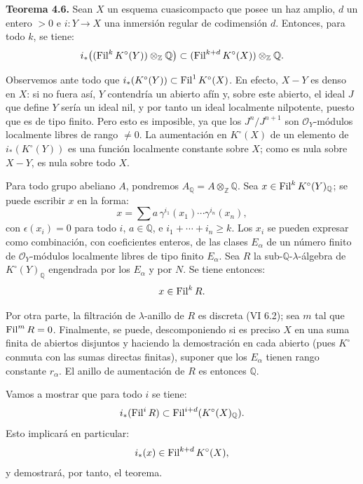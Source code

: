 \providecommand{\sisi}[2]{#2}

\textbf{Teorema 4.6.} Sean \(X\) un esquema cuasicompacto que posee un haz amplio, \(d\) un entero \(>0\) e \(i:Y\to X\) una inmersión regular de codimensión \(d\). Entonces, para todo \(k\), se tiene:
\[
 i_*\bigl((\operatorname{Fil}^kK^\circ(Y))\otimes_{\mathbb Z}\mathbb Q\bigr)
 \subset
 (\operatorname{Fil}^{k+d}K^\circ(X))\otimes_{\mathbb Z}\mathbb Q.
\]

Observemos ante todo que \(i_*(K^\circ(Y))\subset \operatorname{Fil}^1K^\circ(X)\). En efecto, \(X-Y\) es denso en \(X\): si no fuera así, \(Y\) contendría un abierto afín y, sobre este abierto, el ideal \(J\) que define \(Y\) sería un ideal nil, y por tanto un ideal localmente nilpotente, puesto que es de tipo finito. Pero esto es imposible, ya que los \(J^n/J^{n+1}\) son \(\mathcal O_Y\)-módulos localmente libres de rango \(\ne0\). La aumentación en \(K^\circ(X)\) de un elemento de \(i_*(K^\circ(Y))\) es una función localmente constante sobre \(X\); como es nula sobre \(X-Y\), es nula sobre todo \(X\).

Para todo grupo abeliano \(A\), pondremos \(A_{\mathbb Q}=A\otimes_{\mathbb Z}\mathbb Q\). Sea \(x\in\operatorname{Fil}^kK^\circ(Y)_{\mathbb Q}\); se puede escribir \(x\) en la forma:
\[
  x=\sum a\,\gamma^{i_1}(x_1)\cdots\gamma^{i_n}(x_n),
\]
con \(\epsilon(x_i)=0\) para todo \(i\), \(a\in\mathbb Q\), e \(i_1+\cdots+i_n\ge k\). Los \(x_i\) se pueden expresar como combinación, con coeficientes enteros, de las clases \(E_\alpha\) de un número finito de \(\mathcal O_Y\)-módulos localmente libres de tipo finito \(E_\alpha\). Sea \(R\) la sub-\(\mathbb Q\)-\(\lambda\)-álgebra de \(K^\circ(Y)_{\mathbb Q}\) engendrada por los \(E_\alpha\) y por \(N\). Se tiene entonces:
\[
  x\in\operatorname{Fil}^kR.
\]

Por otra parte, la filtración de \(\lambda\)-anillo de \(R\) es discreta (VI 6.2); sea \(m\) tal que \(\operatorname{Fil}^mR=0\). Finalmente, se puede, descomponiendo si es preciso \(X\) en una suma finita de abiertos disjuntos y haciendo la demostración en cada abierto (pues \(K^\circ\) conmuta con las sumas directas finitas), suponer que los \(E_\alpha\) tienen rango constante \(r_\alpha\). El anillo de aumentación de \(R\) es entonces \(\mathbb Q\).

Vamos a mostrar que para todo \(i\) se tiene:
\[
  i_*(\operatorname{Fil}^iR)\subset \operatorname{Fil}^{i+d}(K^\circ(X)_{\mathbb Q}).
\]
Esto implicará en particular:
\[
  i_*(x)\in\operatorname{Fil}^{k+d}K^\circ(X),
\]
y demostrará, por tanto, el teorema.

